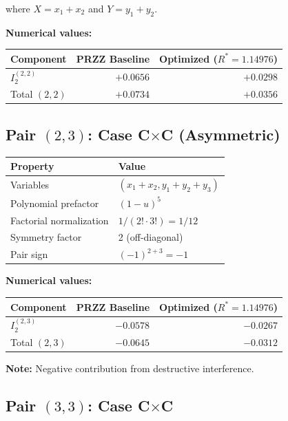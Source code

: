 \documentclass[11pt]{article}
\begin{document}
where $X = x_1+x_2$ and $Y = y_1+y_2$.

\textbf{Numerical values:}

\begin{center}
\begin{tabular}{lrr}
\toprule
Component & PRZZ Baseline & Optimized ($R^*=1.14976$) \\
\midrule
$I_2^{(2,2)}$ & $+0.0656$ & $+0.0298$ \\
Total $(2,2)$ & $+0.0734$ & $+0.0356$ \\
\bottomrule
\end{tabular}
\end{center}

\subsection{Pair $(2,3)$: Case C$\times$C (Asymmetric)}

\begin{center}
\begin{tabular}{ll}
\toprule
Property & Value \\
\midrule
Variables & $(x_1+x_2, y_1+y_2+y_3)$ \\
Polynomial prefactor & $(1-u)^5$ \\
Factorial normalization & $1/(2! \cdot 3!) = 1/12$ \\
Symmetry factor & 2 (off-diagonal) \\
Pair sign & $(-1)^{2+3} = -1$ \\
\bottomrule
\end{tabular}
\end{center}

\textbf{Numerical values:}

\begin{center}
\begin{tabular}{lrr}
\toprule
Component & PRZZ Baseline & Optimized ($R^*=1.14976$) \\
\midrule
$I_2^{(2,3)}$ & $-0.0578$ & $-0.0267$ \\
Total $(2,3)$ & $-0.0645$ & $-0.0312$ \\
\bottomrule
\end{tabular}
\end{center}

\textbf{Note:} Negative contribution from destructive interference.

\subsection{Pair $(3,3)$: Case C$\times$C}
\end{document}

